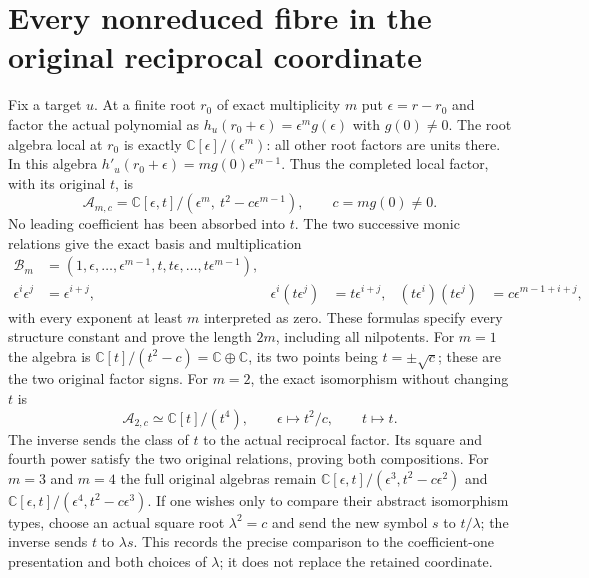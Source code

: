 \documentclass[11pt]{article}
\newcommand{\C}{\mathbb C}
\begin{document}
\section{Every nonreduced fibre in the original reciprocal coordinate}
Fix a target $u$. At a finite root $r_0$ of exact multiplicity
$m$ put $\epsilon=r-r_0$ and factor the actual polynomial as
$h_u(r_0+\epsilon)=\epsilon^m g(\epsilon)$ with $g(0)\ne0$.
The root algebra local at $r_0$ is exactly
$\C[\epsilon]/(\epsilon^m)$: all other root factors are
units there. In this algebra
$h'_u(r_0+\epsilon)=m g(0)\epsilon^{m-1}$.
Thus the completed local factor, with its original $t$,
is
\begin{equation}
\mathcal A_{m,c}
=\C[\epsilon,t]/(\epsilon^m,\ t^2-c\epsilon^{m-1}),
\qquad c=m g(0)\ne0 .
\tag{FS21}
\end{equation}
No leading coefficient has been absorbed into $t$.
The two successive monic relations give the exact basis
and multiplication
\begin{align}
\mathcal B_m&=(1,\epsilon,\ldots,\epsilon^{m-1},
              t,t\epsilon,\ldots,t\epsilon^{m-1}),\nonumber\\
\epsilon^i\epsilon^j&=\epsilon^{i+j},&
\epsilon^i(t\epsilon^j)&=t\epsilon^{i+j},&
(t\epsilon^i)(t\epsilon^j)&=c\epsilon^{m-1+i+j},
\tag{FS22}
\end{align}
with every exponent at least $m$ interpreted as zero.
These formulas specify every structure constant and prove
the length $2m$, including all nilpotents.
For $m=1$ the algebra is
$\C[t]/(t^2-c)=\C\oplus\C$, its two points being
$t=\pm\sqrt c$; these are the two original factor signs.
For $m=2$, the exact isomorphism without changing $t$ is
\begin{equation}
\mathcal A_{2,c}\simeq\C[t]/(t^4),\qquad
\epsilon\longmapsto t^2/c,\qquad
t\longmapsto t .
\tag{FS23}
\end{equation}
The inverse sends the class of $t$ to the actual reciprocal
factor. Its square and fourth power satisfy the two original
relations, proving both compositions.
For $m=3$ and $m=4$ the full original algebras remain
$\C[\epsilon,t]/(\epsilon^3,t^2-c\epsilon^2)$ and
$\C[\epsilon,t]/(\epsilon^4,t^2-c\epsilon^3)$.
If one wishes only to compare their abstract isomorphism
types, choose an actual square root $\lambda^2=c$ and send
the new symbol $s$ to $t/\lambda$; the inverse sends $t$
to $\lambda s$. This records the precise comparison to
the coefficient-one presentation and both choices of
$\lambda$; it does not replace the retained coordinate.
\end{document}
